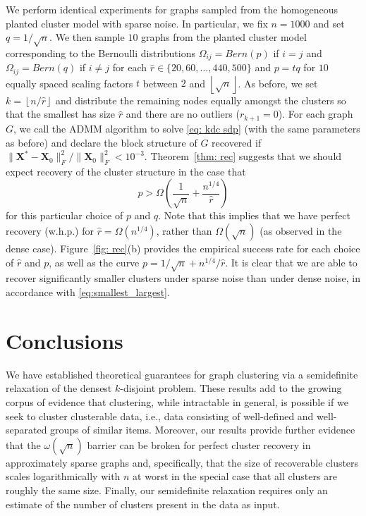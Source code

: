 \documentclass[twoside,11pt]{article}
\newcommand{\bs}{\boldsymbol}
\newcommand{\X}{\bs {X}}
\newcommand{\0}{\bs{0}}
\newcommand{\rbra}[1]{\ensuremath{\left( #1 \right)}} %
\newcommand{\floor}[1]{\ensuremath{\left\lfloor #1 \right\rfloor}}
\begin{document}
{%
We perform identical experiments for graphs sampled from the homogeneous planted cluster model with sparse noise.
In particular, we fix \( n =1000\) and set $q = 1/\sqrt{n}$. We then sample \(10\) graphs
from the planted cluster model corresponding to the Bernoulli
distributions \(\Omega_{ij} = Bern(p)\) if $i =j$ and \(\Omega_{ij} = Bern(q)\) if $i\neq j$ for each
\( \hat r \in \{20,60,\dots, 440, 500\}\) and $p = tq$ for $10$ equally spaced scaling factors $t$ between $2$ and $\floor{\sqrt{n}}$.
As before, we set $k = \floor{n/\hat r}$ and distribute the remaining nodes equally amongst the clusters so that the smallest has size $\hat{r}$ and there are no outliers ($r_{k+1} = 0$).
For each graph \(G\), we call the ADMM algorithm to solve \eqref{eq: kdc sdp} (with the same parameters as before)
and declare the block structure of \(G\) recovered if \(\|\X^* - \X_0\|^2_F / \|\X_0\|^2_F < 10^{-3} \).
Theorem~\ref{thm: rec} suggests that we should expect recovery of the cluster structure in the case that
\[
	p >  \Omega\rbra{\frac{1}{\sqrt{n}} + \frac{n^{1/4}}{\hat r}}
\]
for this particular choice of $p$ and $q$.
Note that this implies that we have perfect recovery (w.h.p.) for $\hat r = \Omega(n^{1/4})$, rather than $\Omega(\sqrt{n})$ (as observed in the dense case).
Figure~\ref{fig: rec}(b) provides the empirical success rate for each choice of \(\hat r\) and \(p\), as well as the curve \(p = 1/\sqrt{n} + n^{1/4}/\hat{r}\).
It is clear that we are able to recover significantly smaller clusters under sparse noise than under dense noise, in accordance with \eqref{eq:smallest_largest}.

\section{Conclusions}
\label{sec: con}
We have established theoretical guarantees for graph clustering via a semidefinite relaxation of the densest \(k\)-disjoint problem.
These results add to the growing corpus of evidence that clustering, while intractable in general,
is possible if we seek to cluster clusterable data, i.e., data consisting of well-defined and well-separated groups of similar items.
Moreover, our results provide further evidence that the \(\omega(\sqrt{n})\) barrier can be broken for perfect cluster recovery in approximately sparse graphs and, specifically, that the size of recoverable clusters
scales logarithmically with \(n\) at worst in the special case that all clusters
are roughly the same size.
Finally, our semidefinite relaxation requires only an estimate of the
number of clusters present in the data as input.

}
\end{document}
